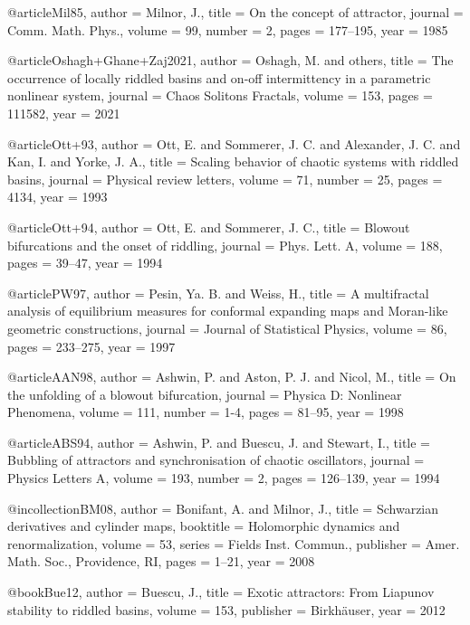 @article{Mil85,
  author = {Milnor, J.},
  title = {On the concept of attractor},
  journal = {Comm. Math. Phys.},
  volume = {99},
  number = {2},
  pages = {177--195},
  year = {1985}
}

@article{Oshagh+Ghane+Zaj2021,
  author = {Oshagh, M. and others},
  title = {The occurrence of locally riddled basins and on-off intermittency in a parametric nonlinear system},
  journal = {Chaos Solitons Fractals},
  volume = {153},
  pages = {111582},
  year = {2021}
}

@article{Ott+93,
  author = {Ott, E. and Sommerer, J. C. and Alexander, J. C. and Kan, I. and Yorke, J. A.},
  title = {Scaling behavior of chaotic systems with riddled basins},
  journal = {Physical review letters},
  volume = {71},
  number = {25},
  pages = {4134},
  year = {1993}
}

@article{Ott+94,
  author = {Ott, E. and Sommerer, J. C.},
  title = {Blowout bifurcations and the onset of riddling},
  journal = {Phys. Lett. A},
  volume = {188},
  pages = {39--47},
  year = {1994}
}

@article{PW97,
  author = {Pesin, Ya. B. and Weiss, H.},
  title = {A multifractal analysis of equilibrium measures for conformal expanding maps and Moran-like geometric constructions},
  journal = {Journal of Statistical Physics},
  volume = {86},
  pages = {233--275},
  year = {1997}
}

@article{AAN98,
  author = {Ashwin, P. and Aston, P. J. and Nicol, M.},
  title = {On the unfolding of a blowout bifurcation},
  journal = {Physica D: Nonlinear Phenomena},
  volume = {111},
  number = {1-4},
  pages = {81--95},
  year = {1998}
}

@article{ABS94,
  author = {Ashwin, P. and Buescu, J. and Stewart, I.},
  title = {Bubbling of attractors and synchronisation of chaotic oscillators},
  journal = {Physics Letters A},
  volume = {193},
  number = {2},
  pages = {126--139},
  year = {1994}
}

@incollection{BM08,
  author = {Bonifant, A. and Milnor, J.},
  title = {Schwarzian derivatives and cylinder maps},
  booktitle = {Holomorphic dynamics and renormalization},
  volume = {53},
  series = {Fields Inst. Commun.},
  publisher = {Amer. Math. Soc., Providence, RI},
  pages = {1--21},
  year = {2008}
}

@book{Bue12,
  author = {Buescu, J.},
  title = {Exotic attractors: From Liapunov stability to riddled basins},
  volume = {153},
  publisher = {Birkh{\"a}user},
  year = {2012}
}

